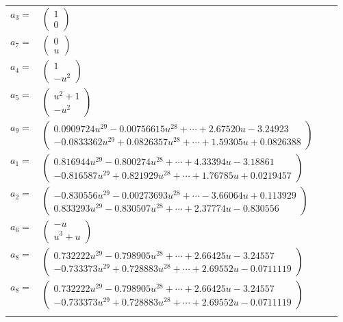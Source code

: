 \documentclass[1p]{elsarticle_modified}
\theoremstyle{definition}
\begin{document}
\begin{tabular}{m{7pt} m{180pt} m{7pt} m{180pt} }
\flushright $a_{3}=$&$\begin{pmatrix}1\\0\end{pmatrix}$ \\
\flushright $a_{7}=$&$\begin{pmatrix}0\\u\end{pmatrix}$ \\
\flushright $a_{4}=$&$\begin{pmatrix}1\\- u^2\end{pmatrix}$ \\
\flushright $a_{5}=$&$\begin{pmatrix}u^2+1\\- u^2\end{pmatrix}$ \\
\flushright $a_{9}=$&$\begin{pmatrix}0.0909724 u^{29}-0.00756615 u^{28}+\cdots+2.67520 u-3.24923\\-0.0833362 u^{29}+0.0826357 u^{28}+\cdots+1.59305 u+0.0826388\end{pmatrix}$ \\
\flushright $a_{1}=$&$\begin{pmatrix}0.816944 u^{29}-0.800274 u^{28}+\cdots+4.33394 u-3.18861\\-0.816587 u^{29}+0.821929 u^{28}+\cdots+1.76785 u+0.0219457\end{pmatrix}$ \\
\flushright $a_{2}=$&$\begin{pmatrix}-0.830556 u^{29}-0.00273693 u^{28}+\cdots-3.66064 u+0.113929\\0.833293 u^{29}-0.830507 u^{28}+\cdots+2.37774 u-0.830556\end{pmatrix}$ \\
\flushright $a_{6}=$&$\begin{pmatrix}- u\\u^3+u\end{pmatrix}$ \\
\flushright $a_{8}=$&$\begin{pmatrix}0.732222 u^{29}-0.798905 u^{28}+\cdots+2.66425 u-3.24557\\-0.733373 u^{29}+0.728883 u^{28}+\cdots+2.69552 u-0.0711119\end{pmatrix}$\\ \flushright $a_{8}=$&$\begin{pmatrix}0.732222 u^{29}-0.798905 u^{28}+\cdots+2.66425 u-3.24557\\-0.733373 u^{29}+0.728883 u^{28}+\cdots+2.69552 u-0.0711119\end{pmatrix}$\\&\end{tabular}
\end{document}
